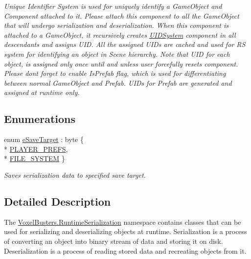 \begin{DoxyCompactItemize}
\begin{DoxyCompactList}\small\item\em Unique Identifier System is used for uniquely identify a Game\+Object and Component attached to it. Please attach this component to all the Game\+Object that will undergo serialization and deserialization. When this component is attached to a Game\+Object, it recursively creates \hyperlink{class_voxel_busters_1_1_runtime_serialization_1_1_u_i_d_system}{U\+I\+D\+System} component in all descendants and assigns U\+I\+D. All the assigned U\+I\+D\textquotesingle{}s are cached and used for R\+S system for identifying an object in Scene hierarchy. Note that U\+I\+D for each object, is assigned only once until and unless user forcefully reset\textquotesingle{}s component. Please dont forget to enable Is\+Prefab flag, which is used for differentiating between normal Game\+Object and Prefab. U\+I\+D\textquotesingle{}s for Prefab are generated and assigned at runtime only. \end{DoxyCompactList}\end{DoxyCompactItemize}
\subsection*{Enumerations}
\begin{DoxyCompactItemize}
\item 
enum \hyperlink{namespace_voxel_busters_1_1_runtime_serialization_aacaa3008b2cb441fbe4708df854019bf}{e\+Save\+Target} \+: byte \{ \\*
\hyperlink{namespace_voxel_busters_1_1_runtime_serialization_aacaa3008b2cb441fbe4708df854019bfa4cc629b75d0db85993aaa1ceab89775e}{P\+L\+A\+Y\+E\+R\+\_\+\+P\+R\+E\+F\+S}, 
\\*
\hyperlink{namespace_voxel_busters_1_1_runtime_serialization_aacaa3008b2cb441fbe4708df854019bfa47859e0cd44b283c0b013bb759600bf7}{F\+I\+L\+E\+\_\+\+S\+Y\+S\+T\+E\+M}
 \}
\begin{DoxyCompactList}\small\item\em Saves serialization data to specified save target. \end{DoxyCompactList}\end{DoxyCompactItemize}


\subsection{Detailed Description}
The \hyperlink{namespace_voxel_busters_1_1_runtime_serialization}{Voxel\+Busters.\+Runtime\+Serialization} namespace contains classes that can be used for serializing and deserializing objects at runtime. Serialization is a process of converting an object into binary stream of data and storing it on disk. Deserialization is a process of reading stored data and recreating objects from it. 

